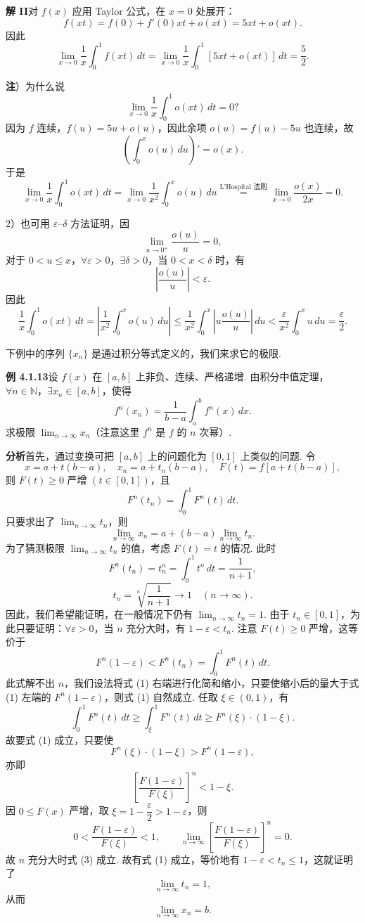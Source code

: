 \documentclass[UTF8,12pt,a4paper,fontset=fandol]{ctexart}
\begin{document}
\noindent\textbf{解 II}\quad 对 $f(x)$ 应用 Taylor 公式，在 $x=0$ 处展开：
\[
f(xt)=f(0)+f'(0)xt+o(xt)=5xt+o(xt).
\]
因此
\[
\lim_{x\to0}\frac1x\int_0^1f(xt)\,dt
=\lim_{x\to0}\frac1x\int_0^1[5xt+o(xt)]\,dt=\frac52.
\]

\noindent\textbf{注}）为什么说
\[
\lim_{x\to0}\frac1x\int_0^1o(xt)\,dt=0?
\]
因为 $f$ 连续，$f(u)=5u+o(u)$，因此余项 $o(u)=f(u)-5u$ 也连续，故
\[
\left(\int_0^x o(u)\,du\right)'=o(x).
\]
于是
\[
\lim_{x\to0}\frac1x\int_0^1o(xt)\,dt
=\lim_{x\to0}\frac1{x^2}\int_0^x o(u)\,du
\stackrel{\text{L'Hospital 法则}}{=}
\lim_{x\to0}\frac{o(x)}{2x}=0.
\]

2）也可用 $\varepsilon$--$\delta$ 方法证明，因
\[
\lim_{u\to0^+}\frac{o(u)}u=0,
\]
对于 $0<u\le x$，$\forall\varepsilon>0$，$\exists\delta>0$，当 $0<x<\delta$ 时，有
\[
\left|\frac{o(u)}u\right|<\varepsilon.
\]
因此
\[
\frac1x\int_0^1o(xt)\,dt
=\left|\frac1{x^2}\int_0^x o(u)\,du\right|
\le\frac1{x^2}\int_0^x\left|u\frac{o(u)}u\right|\,du
<\frac\varepsilon{x^2}\int_0^x u\,du=\frac\varepsilon2.
\]

下例中的序列 $\{x_n\}$ 是通过积分等式定义的，我们来求它的极限.

\noindent\textbf{例 4.1.13}\quad 设 $f(x)$ 在 $[a,b]$ 上非负、连续、严格递增. 由积分中值定理，$\forall n\in\mathbb{N}$，$\exists x_n\in[a,b]$，使得
\[
f^n(x_n)=\frac1{b-a}\int_a^b f^n(x)\,dx.
\]
求极限 $\displaystyle\lim_{n\to\infty}x_n$（注意这里 $f^n$ 是 $f$ 的 $n$ 次幂）.

\noindent\textbf{分析}\quad 首先，通过变换可把 $[a,b]$ 上的问题化为 $[0,1]$ 上类似的问题. 令
\[
x=a+t(b-a),\quad x_n=a+t_n(b-a),\quad F(t)=f[a+t(b-a)],
\]
则 $F(t)\ge0$ 严增 $(t\in[0,1])$，且
\[
F^n(t_n)=\int_0^1F^n(t)\,dt.
\]
只要求出了 $\displaystyle\lim_{n\to\infty}t_n$，则
\[
\lim_{n\to\infty}x_n=a+(b-a)\lim_{n\to\infty}t_n.
\]
为了猜测极限 $\displaystyle\lim_{n\to\infty}t_n$ 的值，考虑 $F(t)=t$ 的情况. 此时
\[
F^n(t_n)=t_n^n=\int_0^1t^n\,dt=\frac1{n+1},
\]
\[
t_n=\sqrt[n]{\frac1{n+1}}\to1\quad(n\to\infty).
\]
因此，我们希望能证明，在一般情况下仍有 $\displaystyle\lim_{n\to\infty}t_n=1$. 由于 $t_n\in[0,1]$，为此只要证明：$\forall\varepsilon>0$，当 $n$ 充分大时，有 $1-\varepsilon<t_n$. 注意 $F(t)\ge0$ 严增，这等价于
\[
F^n(1-\varepsilon)<F^n(t_n)=\int_0^1F^n(t)\,dt.
\tag{1}
\]
此式解不出 $n$，我们设法将式 (1) 右端进行化简和缩小，只要使缩小后的量大于式 (1) 左端的 $F^n(1-\varepsilon)$，则式 (1) 自然成立. 任取 $\xi\in(0,1)$，有
\[
\int_0^1F^n(t)\,dt\ge\int_\xi^1F^n(t)\,dt
\ge F^n(\xi)\cdot(1-\xi).
\]
故要式 (1) 成立，只要使
\[
F^n(\xi)\cdot(1-\xi)>F^n(1-\varepsilon),
\tag{2}
\]
亦即
\[
\left[\frac{F(1-\varepsilon)}{F(\xi)}\right]^n<1-\xi.
\tag{3}
\]
因 $0\le F(x)$ 严增，取 $\xi=1-\dfrac\varepsilon2>1-\varepsilon$，则
\[
0<\frac{F(1-\varepsilon)}{F(\xi)}<1,\qquad
\lim_{n\to\infty}\left[\frac{F(1-\varepsilon)}{F(\xi)}\right]^n=0.
\]
故 $n$ 充分大时式 (3) 成立. 故有式 (1) 成立，等价地有 $1-\varepsilon<t_n\le1$，这就证明了
\[
\lim_{n\to\infty}t_n=1,
\]
从而
\[
\lim_{n\to\infty}x_n=b.
\]
\end{document}

